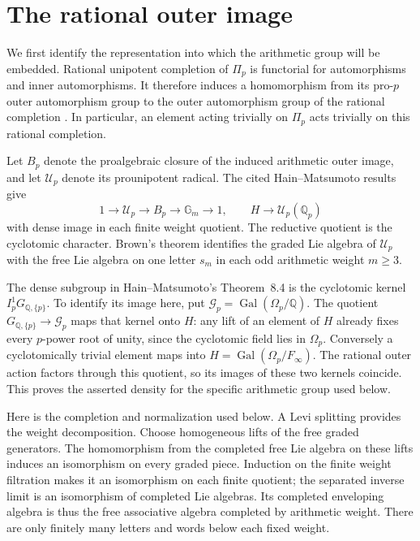 \documentclass[11pt]{article}
\theoremstyle{definition}
\numberwithin{equation}{section}
\begin{document}
\section{The rational outer image}
\label{sec:rational-image}

We first identify the representation into which the arithmetic group
will be embedded. Rational unipotent completion of $\Pi_p$ is
functorial for automorphisms and inner automorphisms. It therefore
induces a homomorphism from its pro-$p$ outer automorphism group to
the outer automorphism group of the rational completion
\cite[Appendix A.6, A.9--A.10]{HainMatsumoto2001}.
In particular, an element acting trivially on $\Pi_p$ acts trivially
on this rational completion.

Let $B_p$ denote the proalgebraic closure of the induced arithmetic
outer image, and let $\mathcal U_p$ denote its prounipotent radical.
The cited Hain--Matsumoto results give
\begin{equation}
 1\longrightarrow\mathcal U_p\longrightarrow B_p
   \longrightarrow\mathbb G_m\longrightarrow1,
 \qquad H\longrightarrow\mathcal U_p(\mathbb Q_p)
\end{equation}
with dense image in each finite weight quotient. The reductive
quotient is the cyclotomic character. Brown's theorem identifies
the graded Lie algebra of $\mathcal U_p$ with the free Lie algebra
on one letter $s_m$ in each odd arithmetic weight $m\ge3$.

The dense subgroup in Hain--Matsumoto's Theorem~8.4 is the
cyclotomic kernel $I_p^1G_{\mathbb Q,\{p\}}$. To identify its image
here, put $\mathcal G_p=\operatorname{Gal}(\Omega_p/\mathbb Q)$.
The quotient $G_{\mathbb Q,\{p\}}\to\mathcal G_p$ maps that kernel
onto $H$: any lift of an element of $H$ already fixes every
$p$-power root of unity, since the cyclotomic field lies in
$\Omega_p$. Conversely a cyclotomically trivial element maps into
$H=\operatorname{Gal}(\Omega_p/F_\infty)$.
The rational outer action factors through this quotient, so its
images of these two kernels coincide. This proves the asserted
density for the specific arithmetic group used below.

Here is the completion and normalization used below. A Levi splitting
provides the weight decomposition. Choose homogeneous lifts of the
free graded generators. The homomorphism from the completed free Lie
algebra on these lifts induces an isomorphism on every graded piece.
Induction on the finite weight filtration makes it an isomorphism
on each finite quotient; the separated inverse limit is an isomorphism
of completed Lie algebras. Its completed enveloping algebra is thus
the free associative algebra completed by arithmetic weight.
There are only finitely many letters and words below each fixed weight.
\end{document}
